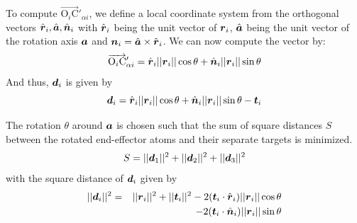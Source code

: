 To compute $\overrightarrow{\text{O}_i\text{C}}'_{\alpha i}$, we define a local coordinate system from the orthogonal vectors $\hat{\boldsymbol{r}}_i, \hat{\boldsymbol{a}}, \hat{\boldsymbol{n}}_i$ with $\hat{\boldsymbol{r}}_i$ being the unit vector of $\boldsymbol{r}_i$, $\hat{\boldsymbol{a}}$ being the unit vector of the rotation axis $\boldsymbol{a}$ and $\boldsymbol{n}_i = \hat{\boldsymbol{a}} \times \hat{\boldsymbol{r}}_i$. We can now compute the vector by:
$$\overrightarrow{\text{O}_i\text{C}}'_{\alpha i} = \hat{\boldsymbol{r}}_i||\boldsymbol{r}_i||\cos\theta + \hat{\boldsymbol{n}}_i||\boldsymbol{r}_i||\sin\theta$$
And thus, $\boldsymbol{d}_i$ is given by
$$\boldsymbol{d}_i =  \hat{\boldsymbol{r}}_i||\boldsymbol{r}_i||\cos\theta + \hat{\boldsymbol{n}}_i||\boldsymbol{r}_i||\sin\theta - \boldsymbol{t}_i$$

The rotation $\theta$ around $\boldsymbol{a}$ is chosen such that the sum of square distances $S$ between the rotated end-effector atoms and their separate targets is minimized.
$$S=||\boldsymbol{d}_1||^2+||\boldsymbol{d}_2||^2+||\boldsymbol{d}_3||^2$$
with the square distance of $\boldsymbol{d}_i$ given by
\begin{eqnarray*}
||\boldsymbol{d}_i||^2 &=& ||\boldsymbol{r}_i||^2 + ||\boldsymbol{t}_i||^2 - 2(\boldsymbol{t}_i\cdot\hat{\boldsymbol{r}}_i)||\boldsymbol{r}_i||\cos\theta\\
&& - 2(\boldsymbol{t}_i\cdot\hat{\boldsymbol{n}}_i)||\boldsymbol{r}_i||\sin\theta
\end{eqnarray*}

